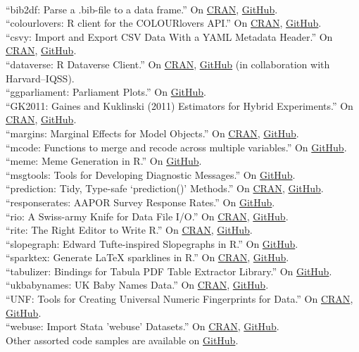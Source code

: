 \documentclass[12pt]{article}
\renewcommand{\section}[1]{\pagebreak[3]%
    \llap{\scshape\smash{\parbox[t]{\marginparwidth}{\raggedright {\color{lg}#1}}}}%
    \vspace{-\baselineskip}\par}
\newcommand{\topic}[1]{\pagebreak[3]\indent {\color{lg}{\footnotesize #1 }}\\}
\newcommand{\entry}[1]{\indent {\color{lg}\guillemotright}\hspace{2pt}#1\vspace{.25em}\\}
\begin{document}
{\section{Software}
\topic{R Packages}
	\entry{``bib2df: Parse a .bib-file to a data frame.'' On \href{https://cran.r-project.org/package=bib2df}{CRAN}, \href{https://github.com/ottlngr/bib2df}{GitHub}.}
	\entry{``colourlovers: R client for the COLOURlovers API.'' On \href{https://cran.r-project.org/package=colourlovers}{CRAN}, \href{https://github.com/leeper/colourlovers}{GitHub}.}
	\entry{``csvy: Import and Export CSV Data With a YAML Metadata Header.'' On \href{https://cran.r-project.org/package=csvy}{CRAN}, \href{https://github.com/leeper/csvy}{GitHub}.}
	\entry{``dataverse: R Dataverse Client.'' On \href{https://cran.r-project.org/package=dataverse}{CRAN}, \href{https://github.com/iqss/dataverse-client-r}{GitHub} (in collaboration with Harvard--IQSS).}
	\entry{``ggparliament: Parliament Plots.'' On \href{https://github.com/leeper/ggparliament}{GitHub}.}
    \entry{``GK2011: Gaines and Kuklinski (2011) Estimators for Hybrid Experiments.'' On \href{https://cran.r-project.org/package=GK2011}{CRAN}, \href{https://github.com/leeper/GK2011}{GitHub}.}
	\entry{``margins: Marginal Effects for Model Objects.'' On \href{https://cran.r-project.org/package=margins}{CRAN}, \href{https://github.com/leeper/margins}{GitHub}.}
	\entry{``mcode: Functions to merge and recode across multiple variables.'' On \href{https://github.com/leeper/mcode}{GitHub}.}
	\entry{``meme: Meme Generation in R.'' On \href{https://github.com/leeper/meme}{GitHub}.}
	\entry{``msgtools: Tools for Developing Diagnostic Messages.'' On \href{https://github.com/RL10N/msgtools}{GitHub}.}
	\entry{``prediction: Tidy, Type-safe `prediction()' Methods.'' On \href{https://cran.r-project.org/package=prediction}{CRAN}, \href{https://github.com/leeper/prediction}{GitHub}.}
	\entry{``responserates: AAPOR Survey Response Rates.'' On \href{https://github.com/leeper/responserates}{GitHub}.}
	\entry{``rio: A Swiss-army Knife for Data File I/O.'' On \href{https://cran.r-project.org/package=rio}{CRAN}, \href{https://github.com/leeper/rio}{GitHub}.}
	\entry{``rite: The Right Editor to Write R.'' On \href{https://cran.r-project.org/package=rite}{CRAN}, \href{https://github.com/leeper/rio}{GitHub}.}
	\entry{``slopegraph: Edward Tufte-inspired Slopegraphs in R.'' On \href{https://github.com/leeper/slopegraph}{GitHub}.}
	\entry{``sparktex: Generate LaTeX sparklines in R.'' On \href{https://cran.r-project.org/package=sparktex}{CRAN}, \href{https://github.com/leeper/sparktex}{GitHub}.}
	\entry{``tabulizer: Bindings for Tabula PDF Table Extractor Library.'' On \href{https://github.com/ropensci/tabulizer}{GitHub}.}
	\entry{``ukbabynames: UK Baby Names Data.'' On \href{https://cran.r-project.org/package=ukbabynames}{CRAN}, \href{https://github.com/leeper/ukbabynames}{GitHub}.}
	\entry{``UNF: Tools for Creating Universal Numeric Fingerprints for Data.'' On \href{https://cran.r-project.org/package=UNF}{CRAN}, \href{https://github.com/leeper/UNF}{GitHub}.}
	\entry{``webuse: Import Stata 'webuse' Datasets.'' On \href{https://cran.r-project.org/package=webuse}{CRAN}, \href{https://github.com/leeper/webuse}{GitHub}.}
	\entry{Other assorted code samples are available on \href{http://github.com/leeper}{GitHub}.}

}
\end{document}
